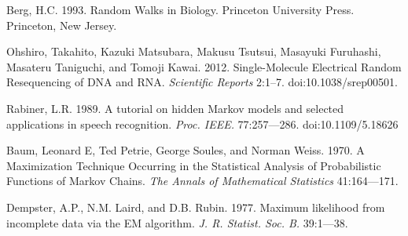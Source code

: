 \documentclass{biophys_letter}
\begin{document}
\begin{thebibliography}{99}
  Berg, H.C.
  1993.
  Random Walks in Biology.
  Princeton University Press.
  Princeton, New Jersey.

  Ohshiro, Takahito, Kazuki Matsubara, Makusu Tsutsui, Masayuki Furuhashi, Masateru Taniguchi, and Tomoji Kawai. 
  2012.
  Single-Molecule Electrical Random Resequencing of DNA and RNA.
  {\it Scientific Reports} 
  2:1--7.
  doi:10.1038/srep00501.

  Rabiner, L.R.
  1989.
  A tutorial on hidden Markov models and selected applications in speech recognition.
  {\it Proc. IEEE.}
  77:257---286.
  doi:10.1109/5.18626

  Baum, Leonard E, Ted Petrie, George Soules, and Norman Weiss. 
  1970.
  A Maximization Technique Occurring in the Statistical Analysis of Probabilistic Functions of Markov Chains.
  {\it The Annals of Mathematical Statistics}
  41:164---171.

  Dempster, A.P., N.M. Laird, and D.B. Rubin.
  1977.
  Maximum likelihood from incomplete data via the EM algorithm.
  {\it J. R. Statist. Soc. B.}
  39:1---38.

\end{thebibliography}
\end{document}
